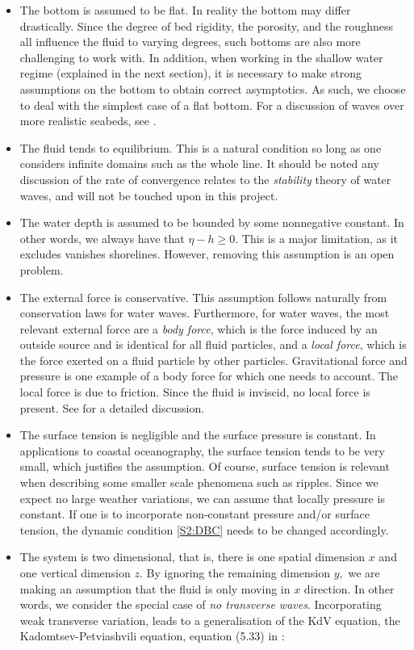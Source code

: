 \documentclass[11pt,reqno,oneside,a4paper]{article}
\begin{document}
\begin{itemize}
\item The bottom is assumed to be flat. In reality the bottom may differ drastically. Since the degree of bed rigidity, the porosity, and the roughness all influence the fluid to varying degrees, such bottoms are also more challenging to work with. In addition, when working in the shallow water regime (explained in the next section), it is necessary to make strong assumptions on the bottom to obtain correct asymptotics. As such, we choose to deal with the simplest case of a flat bottom. For a discussion of waves over more realistic seabeds, see \cite[Chapter 9]{DD}.
\item The fluid tends to equilibrium. This is a natural condition so long as one considers infinite domains such as the whole line. It should be noted any discussion of the rate of convergence relates to the \textit{stability} theory of water waves, and will not be touched upon in this project.
\item The water depth is assumed to be bounded by some nonnegative constant. In other words, we always have that $\eta - h \geq 0.$ This is a major limitation, as it excludes vanishes shorelines. However, removing this assumption is an open problem.
\item The external force is conservative. This assumption follows naturally from conservation laws for water waves. Furthermore, for water waves, the most relevant external force are a \textit{body force}, which is the force induced by an outside source and is identical for all fluid particles, and a \textit{local force}, which is the force exerted on a fluid particle by other particles. Gravitational force and pressure is one example of a body force for which one needs to account. The local force is due to friction. Since the fluid is inviscid, no local force is present. See \cite[Chapter 4]{CK} for a detailed discussion.
\item The surface tension is negligible and the surface pressure is constant. In applications to coastal oceanography, the surface tension tends to be very small, which justifies the assumption. Of course, surface tension is relevant when describing some smaller scale phenomena such as ripples. Since we expect no large weather variations, we can assume that locally pressure is constant. If one is to incorporate non-constant pressure and/or surface tension, the dynamic condition \eqref{S2:DBC} needs to be changed accordingly.
\item The system is two dimensional, that is, there is one spatial dimension $x$ and one vertical dimension $z.$ By ignoring the remaining dimension $y,$ we are making an assumption that the fluid is only moving in $x$ direction. In other words, we consider the special case of \textit{no transverse waves}.  Incorporating weak transverse variation, leads to a generalisation of the KdV equation, the Kadomtsev-Petviashvili equation, equation (5.33) in \cite[Chapter 5]{Ablowitz}:

\end{itemize}
\end{document}
